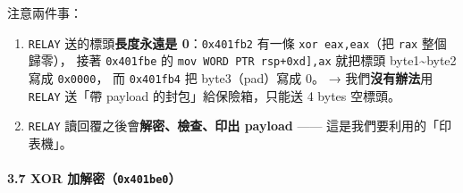 \documentclass[10pt,a4paper]{article}
\providecommand{\tightlist}{%
  \setlength{\itemsep}{0pt}\setlength{\parskip}{0pt}}
\begin{document}
注意兩件事：

\begin{enumerate}
\def\labelenumi{\arabic{enumi}.}
\tightlist
\item
  \texttt{RELAY} 送的標頭\textbf{長度永遠是 0}：\texttt{0x401fb2} 有一條
  \texttt{xor\ \allowbreak{}eax,\allowbreak{}eax}（把 \texttt{rax} 整個歸零）， 接著
  \texttt{0x401fbe} 的 \texttt{mov\ \allowbreak{}WORD\ \allowbreak{}PTR\ \allowbreak{}{[}rsp+0xd{]},\allowbreak{}ax}
  就把標頭 byte1\textasciitilde byte2 寫成 \texttt{0x0000}， 而
  \texttt{0x401fb4} 把 byte3（pad）寫成 0。 → 我們\textbf{沒有辦法}用
  \texttt{RELAY} 送「帶 payload 的封包」給保險箱，只能送 4 bytes
  空標頭。
\item
  \texttt{RELAY} 讀回覆之後會\textbf{解密、檢查、印出 payload} ------
  這是我們要利用的「印表機」。
\end{enumerate}

\paragraph{\texorpdfstring{3.7 XOR
加解密（\texttt{0x401be0}）}{3.7 XOR 加解密（0x401be0）}}\label{xor-ux52a0ux89e3ux5bc60x401be0}
\end{document}

